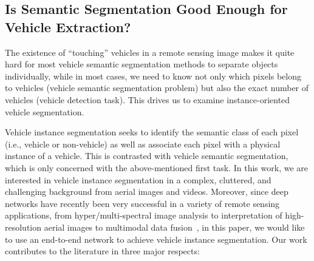 \documentclass[journal]{IEEEtran}
\begin{document}
\subsection{Is Semantic Segmentation Good Enough for Vehicle Extraction?}
The existence of ``touching'' vehicles in a remote sensing image makes it quite hard for most vehicle semantic segmentation methods to separate objects individually, while in most cases, we need to know not only which pixels belong to vehicles (vehicle semantic segmentation problem) but also the exact number of vehicles (vehicle detection task). This drives us to examine instance-oriented vehicle segmentation.
\par
Vehicle instance segmentation seeks to identify the semantic class of each pixel (i.e., vehicle or non-vehicle) as well as associate each pixel with a physical instance of a vehicle. This is contrasted with vehicle semantic segmentation, which is only concerned with the above-mentioned first task. In this work, we are interested in vehicle instance segmentation in a complex, cluttered, and challenging background from aerial images and videos. Moreover, since deep networks have recently been very successful in a variety of remote sensing applications, from hyper/multi-spectral image analysis to interpretation of high-resolution aerial images to multimodal data fusion~\cite{Zhu17DLinRS}, in this paper, we would like to use an end-to-end network to achieve vehicle instance segmentation. Our work contributes to the literature in three major respects:
\end{document}

